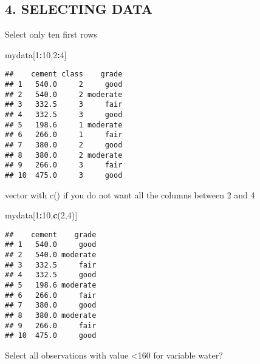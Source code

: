 \documentclass[]{article}
\newenvironment{Shaded}{\begin{snugshade}}{\end{snugshade}}
\newcommand{\DecValTok}[1]{\textcolor[rgb]{0.00,0.00,0.81}{#1}}
\newcommand{\KeywordTok}[1]{\textcolor[rgb]{0.13,0.29,0.53}{\textbf{#1}}}
\newcommand{\NormalTok}[1]{#1}
\newcommand{\OperatorTok}[1]{\textcolor[rgb]{0.81,0.36,0.00}{\textbf{#1}}}
\begin{document}
\hypertarget{selecting-data}{%
\subsection{4. SELECTING DATA}\label{selecting-data}}

Select only ten first rows

\begin{Shaded}
\begin{Highlighting}[]
\NormalTok{mydata[}\DecValTok{1}\OperatorTok{:}\DecValTok{10}\NormalTok{,}\DecValTok{2}\OperatorTok{:}\DecValTok{4}\NormalTok{]}
\end{Highlighting}
\end{Shaded}

\begin{verbatim}
##    cement class    grade
## 1   540.0     2     good
## 2   540.0     2 moderate
## 3   332.5     3     fair
## 4   332.5     3     good
## 5   198.6     1 moderate
## 6   266.0     1     fair
## 7   380.0     2     good
## 8   380.0     2 moderate
## 9   266.0     3     fair
## 10  475.0     3     good
\end{verbatim}

vector with c() if you do not want all the columns between 2 and 4

\begin{Shaded}
\begin{Highlighting}[]
\NormalTok{mydata[}\DecValTok{1}\OperatorTok{:}\DecValTok{10}\NormalTok{,}\KeywordTok{c}\NormalTok{(}\DecValTok{2}\NormalTok{,}\DecValTok{4}\NormalTok{)]}
\end{Highlighting}
\end{Shaded}

\begin{verbatim}
##    cement    grade
## 1   540.0     good
## 2   540.0 moderate
## 3   332.5     fair
## 4   332.5     good
## 5   198.6 moderate
## 6   266.0     fair
## 7   380.0     good
## 8   380.0 moderate
## 9   266.0     fair
## 10  475.0     good
\end{verbatim}

Select all observations with value \textless{}160 for variable water?

\begin{Shaded}
\end{Shaded}
\end{document}
